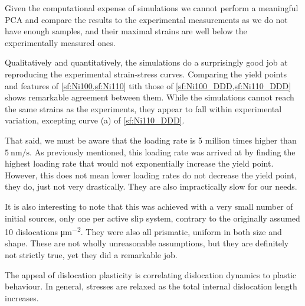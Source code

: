 Given the computational expense of simulations we cannot perform a meaningful PCA and compare the results to the experimental measurements as we do not have enough samples, and their maximal strains are well below the experimentally measured ones.

Qualitatively and quantitatively, the simulations do a surprisingly good job at reproducing the experimental strain-stress curves. Comparing the yield points and features of \cref{sf:Ni100,sf:Ni110} tith those of \cref{sf:Ni100_DDD,sf:Ni110_DDD} shows remarkable agreement between them. While the simulations cannot reach the same strains as the experiments, they appear to fall within experimental variation, excepting curve (a) of \cref{sf:Ni110_DDD}.

That said, we must be aware that the loading rate is 5 million times higher than $\SI{5}{\nano\meter\per\second}$. As previously mentioned, this loading rate was arrived at by finding the highest loading rate that would not exponentially increase the yield point. However, this does not mean lower loading rates do not decrease the yield point, they do, just not very drastically. They are also impractically slow for our needs.

It is also interesting to note that this was achieved with a very small number of initial sources, only one per active slip system, contrary to the originally assumed 10 dislocations \si{\micro\metre^{-2}}. They were also all prismatic, uniform in both size and shape. These are not wholly unreasonable assumptions, but they are definitely not strictly true, yet they did a remarkable job.

The appeal of dislocation plasticity is correlating dislocation dynamics to plastic behaviour. In general, stresses are relaxed as the total internal dislocation length increases.

